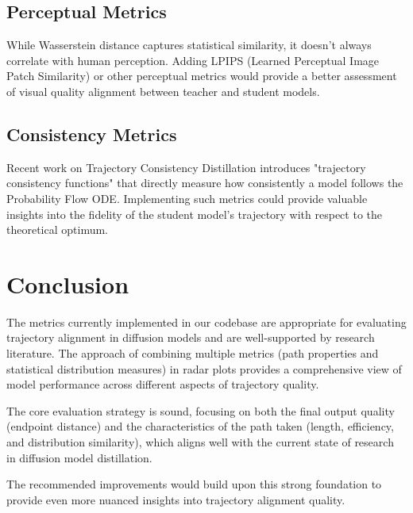 \documentclass{article}
\begin{document}
\subsection{Perceptual Metrics}
While Wasserstein distance captures statistical similarity, it doesn't always correlate with human perception. Adding LPIPS (Learned Perceptual Image Patch Similarity) or other perceptual metrics would provide a better assessment of visual quality alignment between teacher and student models.

\subsection{Consistency Metrics}
Recent work on Trajectory Consistency Distillation \cite{zheng2024trajectory} introduces "trajectory consistency functions" that directly measure how consistently a model follows the Probability Flow ODE. Implementing such metrics could provide valuable insights into the fidelity of the student model's trajectory with respect to the theoretical optimum.

\section{Conclusion}
The metrics currently implemented in our codebase are appropriate for evaluating trajectory alignment in diffusion models and are well-supported by research literature. The approach of combining multiple metrics (path properties and statistical distribution measures) in radar plots provides a comprehensive view of model performance across different aspects of trajectory quality.

The core evaluation strategy is sound, focusing on both the final output quality (endpoint distance) and the characteristics of the path taken (length, efficiency, and distribution similarity), which aligns well with the current state of research in diffusion model distillation.

The recommended improvements would build upon this strong foundation to provide even more nuanced insights into trajectory alignment quality.
\end{document}
